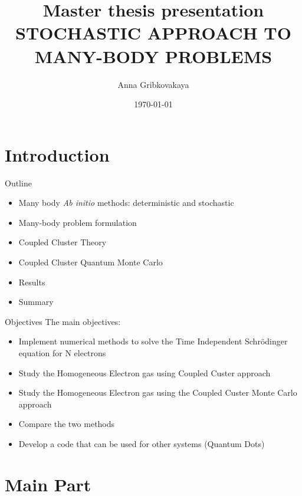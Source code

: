 \documentclass{beamer}
\title{Master thesis presentation\\
STOCHASTIC APPROACH TO MANY-BODY PROBLEMS}
\date{\today}
\author{Anna Gribkovakaya}
\institute{University of Oslo}
\begin{document}
  \maketitle
  \section{Introduction}
   \begin{frame}{Outline}
   \begin{itemize}
   	\item Many body \textit{Ab initio} methods: deterministic and stochastic
   	\item Many-body problem formulation
   	\item Coupled Cluster Theory
   	\item Coupled Cluster Quantum Monte Carlo
   	\item Results
   	\item Summary
   \end{itemize}
 \end{frame}
   \begin{frame}{Objectives}
	The main objectives:
	\begin{itemize}
 	\item Implement numerical methods to solve the Time Independent Schr\"{o}dinger equation for N electrons
 	\item Study the Homogeneous Electron gas using Coupled Custer approach
 	\item Study the Homogeneous Electron gas using the Coupled Custer Monte Carlo approach
 	\item Compare the two methods
 	\item Develop a code that can be used for other systems (Quantum Dots)
	\end{itemize}
	\end{frame}


  \section{Main Part}
  
\end{document}
